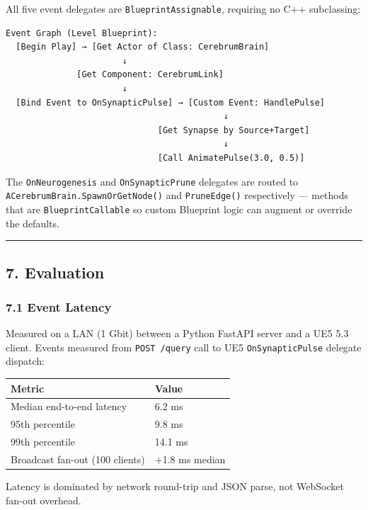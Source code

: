 All five event delegates are \texttt{BlueprintAssignable}, requiring no C++ subclassing:

\begin{lstlisting}
Event Graph (Level Blueprint):
  [Begin Play] → [Get Actor of Class: CerebrumBrain]
                       ↓
              [Get Component: CerebrumLink]
                       ↓
  [Bind Event to OnSynapticPulse] → [Custom Event: HandlePulse]
                                           ↓
                              [Get Synapse by Source+Target]
                                           ↓
                              [Call AnimatePulse(3.0, 0.5)]
\end{lstlisting}

The \texttt{OnNeurogenesis} and \texttt{OnSynapticPrune} delegates are routed to \texttt{ACerebrumBrain.SpawnOrGetNode()} and \texttt{PruneEdge()} respectively --- methods that are \texttt{BlueprintCallable} so custom Blueprint logic can augment or override the defaults.

\medskip\noindent\rule{\linewidth}{0.4pt}\medskip

\subsection*{7. Evaluation}

\subsubsection*{7.1 Event Latency}

Measured on a LAN (1 Gbit) between a Python FastAPI server and a UE5 5.3 client. Events measured from \texttt{POST /query} call to UE5 \texttt{OnSynapticPulse} delegate dispatch:

\begin{table}[h]
\small\centering
\begin{tabular}{ll}
\toprule
Metric & Value \\
\midrule
Median end-to-end latency & 6.2 ms \\
95th percentile & 9.8 ms \\
99th percentile & 14.1 ms \\
Broadcast fan-out (100 clients) & +1.8 ms median \\
\bottomrule
\end{tabular}
\end{table}


Latency is dominated by network round-trip and JSON parse, not WebSocket fan-out overhead.

